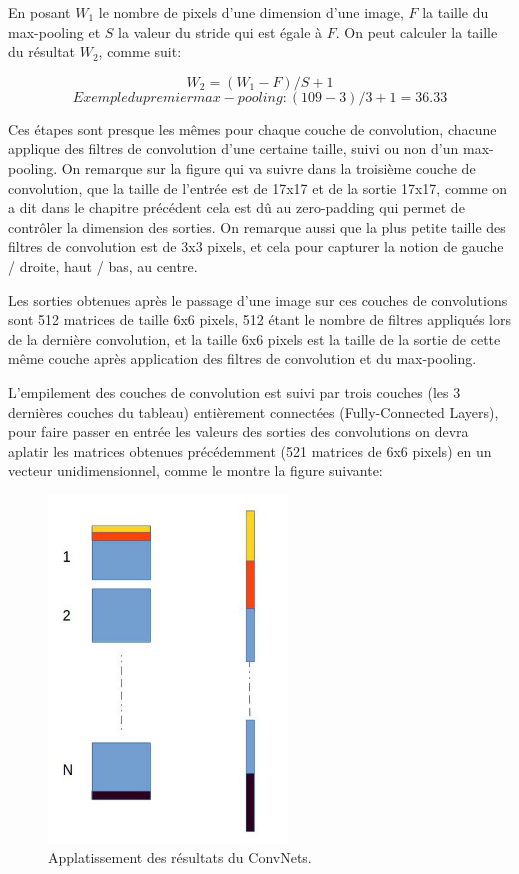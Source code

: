	En posant $W_{1}$ le nombre de pixels d'une dimension d'une image, $F$ la taille du max-pooling et $S$ la valeur du stride qui est égale à $F$. On peut calculer la taille du résultat $W_{2}$, comme suit:

$$W_{2} = (W_{1} - F )/S + 1$$
$$Exemple du premier max-pooling: (109 - 3)/3 +1 = 36.33$$

	Ces étapes sont presque les mêmes pour chaque couche de convolution, chacune applique des filtres de convolution d'une certaine taille, suivi ou non d'un max-pooling. On remarque sur la figure qui va suivre dans la troisième couche de convolution, que la taille de l'entrée est de 17x17 et de la sortie 17x17, comme on a dit dans le chapitre précédent cela est dû au zero-padding qui permet de contrôler la dimension des sorties. On remarque aussi que la plus petite taille des filtres de convolution est de 3x3 pixels, et cela pour capturer la notion de gauche / droite, haut / bas, au centre.

	Les sorties obtenues après le passage d'une image sur ces couches de convolutions sont 512 matrices de taille 6x6 pixels, 512 étant le nombre de filtres appliqués lors de la dernière convolution, et la taille 6x6 pixels est la taille de la sortie de cette même couche après application des filtres de convolution et du max-pooling.

	L'empilement des couches de convolution est suivi par trois couches (les 3 dernières couches du tableau) entièrement connectées (Fully-Connected Layers), pour faire passer en entrée les valeurs des sorties des convolutions on devra aplatir les matrices obtenues précédemment (521 matrices de 6x6 pixels) en un vecteur unidimensionnel, comme le montre la figure suivante:

\begin{figure}[H]
	\centering
		\includegraphics[width=2.5in]{Figures/flattening.jpg}
	\caption[An Electron]{Applatissement des résultats du ConvNets.}
	\label{fig:Electron}
\end{figure}


